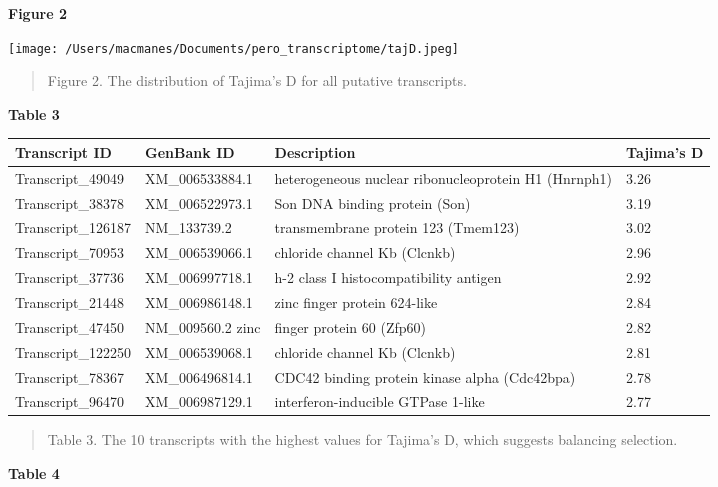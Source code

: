\documentclass[11pt]{article}
\begin{document}
\textbf{\hypertarget{Figure 2}{Figure 2}} \\
\centerline{\texttt{[image: /Users/macmanes/Documents/pero\_transcriptome/tajD.jpeg]}}
\begin{quote}
\small{Figure 2. The distribution of Tajima's D for all putative transcripts.}
\end{quote}  
\vspace{10mm}
\textbf{\hypertarget{Table 3}{Table 3}} \\
\begin{center}
\begin{adjustwidth}{-.75in}{-.75in}%
\begin{tabular}{ l l l l }
\textbf{Transcript ID} & \textbf{GenBank ID} & \textbf{Description} & \textbf{Tajima's D}\\
\hline
Transcript\_49049 & XM\_006533884.1 & heterogeneous nuclear ribonucleoprotein H1 (Hnrnph1) & 3.26\\
Transcript\_38378 & XM\_006522973.1 & Son DNA binding protein (Son) & 3.19\\
Transcript\_126187 & NM\_133739.2 & transmembrane protein 123 (Tmem123) & 3.02\\
Transcript\_70953 & XM\_006539066.1 & chloride channel Kb (Clcnkb) & 2.96 \\
Transcript\_37736 & XM\_006997718.1 & h-2 class I histocompatibility antigen & 2.92 \\
Transcript\_21448 & XM\_006986148.1 & zinc finger protein 624-like & 2.84\\
Transcript\_47450 & NM\_009560.2 zinc & finger protein 60 (Zfp60) & 2.82\\
Transcript\_122250 & XM\_006539068.1 & chloride channel Kb (Clcnkb) & 2.81\\
Transcript\_78367 & XM\_006496814.1 & CDC42 binding protein kinase alpha (Cdc42bpa) & 2.78 \\
Transcript\_96470 & XM\_006987129.1 & interferon-inducible GTPase 1-like & 2.77 \\
 \end{tabular}
\begin{quote}
\small{Table 3. The 10 transcripts with the highest values for Tajima's D, which suggests balancing selection.}
\end{quote}  
\end{adjustwidth}
\end{center}
\vspace{10mm}
\textbf{\hypertarget{Table 4}{Table 4}} \\
\end{document}

